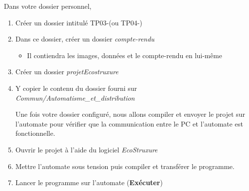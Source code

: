 \begin{UPSTIactivite}
	Dans votre dossier personnel,
	\begin{enumerate}
		\item Créer un dossier intitulé TP03-\nomTP (ou TP04-\nomTP)
		\item Dans ce dossier, créer un dossier \textit{compte-rendu}
		\begin{itemize}
			\item Il contiendra les images, données et le compte-rendu en lui-même
		\end{itemize}
		\item Créer un dossier \textit{projetEcostruxure}
		\item Y copier le contenu du dossier \textit{\nomTP} fourni sur \textit{Commun/Automatisme\_et\_distribution}

	Une fois votre dossier configuré, nous allons compiler et envoyer le projet sur l'automate pour vérifier que la communication entre le PC et l'automate est fonctionnelle.

		\item Ouvrir le projet à l'aide du logiciel \textit{EcoStruxure}
		\item Mettre l'automate sous tension puis compiler et transférer le programme.
		\item Lancer le programme sur l'automate (\textbf{Exécuter})
	\end{enumerate}
\end{UPSTIactivite}
